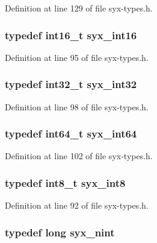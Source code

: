 Definition at line 129 of file syx-types.h.\hypertarget{syx-types_8h_2d6178ce3abc15f1a0df5bbd7eb5e302}{
\subsubsection{\setlength{\rightskip}{0pt plus 5cm}typedef int16\_\-t {\bf syx\_\-int16}}}
\label{syx-types_8h_2d6178ce3abc15f1a0df5bbd7eb5e302}




Definition at line 95 of file syx-types.h.\hypertarget{syx-types_8h_9f31c17555a2dfcf25da84b5c4a2e55b}{
\subsubsection{\setlength{\rightskip}{0pt plus 5cm}typedef int32\_\-t {\bf syx\_\-int32}}}
\label{syx-types_8h_9f31c17555a2dfcf25da84b5c4a2e55b}




Definition at line 98 of file syx-types.h.\hypertarget{syx-types_8h_3e43d32ed4089e8e06e1f8d9576af15c}{
\subsubsection{\setlength{\rightskip}{0pt plus 5cm}typedef int64\_\-t {\bf syx\_\-int64}}}
\label{syx-types_8h_3e43d32ed4089e8e06e1f8d9576af15c}




Definition at line 102 of file syx-types.h.\hypertarget{syx-types_8h_8d3f27f7874e163d9fcda71e7540bdd7}{
\subsubsection{\setlength{\rightskip}{0pt plus 5cm}typedef int8\_\-t {\bf syx\_\-int8}}}
\label{syx-types_8h_8d3f27f7874e163d9fcda71e7540bdd7}




Definition at line 92 of file syx-types.h.\hypertarget{syx-types_8h_488ad2504ade19c761a3e2a1726b4781}{
\subsubsection{\setlength{\rightskip}{0pt plus 5cm}typedef long {\bf syx\_\-nint}}}
\label{syx-types_8h_488ad2504ade19c761a3e2a1726b4781}




